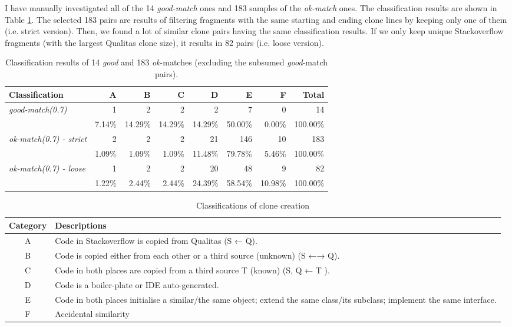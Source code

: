 \documentclass{IEEEtran}
\begin{document}
I have manually investigated all of the 14 \textit{good-match} ones and 183 samples of the \textit{ok-match} ones. The classification results are shown in Table \ref{tab:classification}. The selected 183 pairs are results of filtering fragments with the same starting and ending clone lines by keeping only one of them (i.e. strict version). Then, we found a lot of similar clone pairs having the same classification results. If we only keep unique Stackoverflow fragments (with the largest Qualitas clone size), it results in 82 pairs (i.e. loose version).

\begin{table}
	\centering
	\caption{Classification results of 14 \textit{good} and 183 \textit{ok}-matches (excluding the subsumed \textit{good}-match pairs).}
	\label{tab:classification}
		\begin{tabular}{|l|r|r|r|r|r|r|r|}
			\hline 
			Classification & A & B & C & D & E & F & Total \\ 
			\hline 
		    \multirow{2}{*}{\textit{good-match(0.7)}} & 1 & 2 & 2 & 2 & 7 & 0 & 14 \\ \cline{2-8}
			 & 7.14\%	& 14.29\%	& 14.29\%	& 14.29\%	& 50.00\%	& 0.00\%	& 100.00\% \\ 
			\hline
			\multirow{2}{*}{\textit{ok-match(0.7) - strict}} & 2 & 2 & 2 & 21 & 146 & 10 & 183 \\ \cline{2-8}
			& 1.09\%	& 1.09\%	&	1.09\%	&	11.48\%	&	79.78\%	&	5.46\%	&	100.00\%  \\ 
			\hline
			\multirow{2}{*}{\textit{ok-match(0.7) - loose}}  & 1 & 2 & 2 & 20 & 48 & 9 & 82 \\ \cline{2-8}
			& 1.22\%	&	2.44\%	&	2.44\%	&	24.39\%	&	58.54\%	&	10.98\%	&	100.00\% \\
			\hline 
		\end{tabular} 
\end{table}

\begin{table}
	\centering
	\caption{Classifications of clone creation}
\begin{tabular}{|c|p{13cm}|}
	\hline 
	Category & Descriptions \\ 
	\hline 
	A & Code in Stackoverflow is copied from Qualitas (S ← Q). \\ 
	\hline 
	B & Code is copied either from each other or a third source (unknown) (S ←→ Q).
	\\ 
	\hline 
	C & Code in both places are copied from a third source T (known) (S, Q ← T ).
	\\ 
	\hline 
	D & Code is a boiler-plate or IDE auto-generated.
	\\ 
	\hline 
	E & Code in both places initialise a similar/the same object; extend the same class/its subclass; implement the same interface.
	\\ 
	\hline 
	F & Accidental similarity  \\ 
	\hline 
\end{tabular} 
\end{table}
\end{document}
